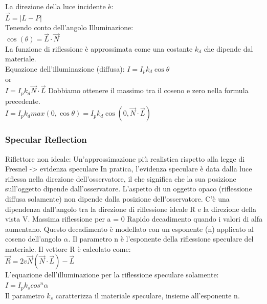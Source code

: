 La direzione della luce incidente è: \\
$ \vec{L}=|L-P| $ \\ 
Tenendo conto dell'angolo Illuminazione: \\
$ \cos(\theta)= \vec{L}\cdot \vec{N}  $ \\
La funzione di riflessione è approssimata come una costante $k_d$ che dipende dal materiale.\\
Equazione dell'illuminazione (diffusa):
$I=I_p k_d \cos \theta$ \\
or \\
$I=I_p k_d \vec{N}\cdot\vec{L}$
Dobbiamo ottenere il massimo tra il coseno e zero nella formula precedente. \\
$I=I_p k_d max(0,\cos \theta)=I_p k_d \cos(0,\vec{N} \cdot \vec{L}) $ \\
\subsubsection{Specular Reflection}
Riflettore non ideale:
Un'approssimazione più realistica rispetto alla legge di Fresnel
-> evidenza speculare
In pratica, l'evidenza speculare è data dalla luce riflessa nella direzione dell'osservatore, il che significa che la sua posizione sull'oggetto dipende dall'osservatore.
L'aspetto di un oggetto opaco (riflessione diffusa solamente) non dipende dalla posizione dell'osservatore.
C'è una dipendenza dall'angolo tra la direzione di riflessione ideale R e la direzione della vista V.
Massima riflessione per a = 0
Rapido decadimento quando i valori di alfa aumentano.
Questo decadimento è modellato con un esponente (n) applicato al coseno dell'angolo $\alpha$.
Il parametro n è l'esponente della riflessione speculare del materiale.
Il vettore R è calcolato come: \\
$\vec{R}=2v \vec{N} ( \vec{N} \cdot \vec{L})- \vec{L}$ \\
L'equazione dell'illuminazione per la riflessione speculare solamente: \\
$I=I_pk_s cos^n\alpha $ \\
Il parametro $k_s$ caratterizza il materiale speculare, insieme all'esponente n.
